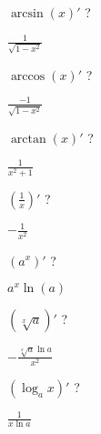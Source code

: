 \documentclass[12pt]{article}
\newcommand*{\xfield}[1]{\begin{mdframed}\centering #1\end{mdframed}\bigskip}
\newenvironment{note}{}{}
\begin{document}
\begin{note}
	\xfield{$\arcsin(x)'$ ?}
	\xfield{$\frac{1}{\sqrt{1-x^2}}$}
\end{note}

\begin{note}
	\xfield{$\arccos(x)'$ ?}
	\xfield{$\frac{-1}{\sqrt{1-x^2}}$}
\end{note}


\begin{note}
	\xfield{$\arctan(x)'$ ?}
	\xfield{$\frac{1}{x^2+1}$}
\end{note}

\begin{note}
	\xfield{$(\frac{1}{x})'$ ?}
	\xfield{$-\frac{1}{x^2}$}
\end{note}

\begin{note}
	\xfield{$(a^x)'$ ?}
	\xfield{$a^x \ln(a)$}
\end{note}

\begin{note}
	\xfield{$(\sqrt[x]{a})'$ ?}
	\xfield{$-\frac{\sqrt[x]{a}\ln a}{x^2}$}
\end{note}

\begin{note}
	\xfield{$(\log_a x)'$ ?}
	\xfield{$\frac{1}{x\ln a}$}
\end{note}
\end{document}
